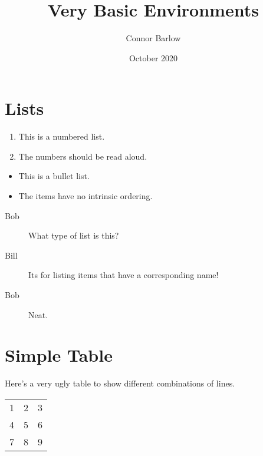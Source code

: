 \documentclass{article}
\title{Very Basic Environments}
\author{Connor Barlow}
\date{October 2020}
\begin{document}
\maketitle

\section{Lists}
\begin{enumerate}
    \item This is a numbered list.
    \item The numbers should be read aloud.
\end{enumerate}
\begin{itemize}
    \item This is a bullet list.
    \item The items have no intrinsic ordering.
\end{itemize}
\begin{description}
    \item[Bob] What type of list is this?
    \item[Bill] Its for listing items that have a corresponding name!
    \item[Bob] Neat.
\end{description}
\section{Simple Table}
\par
Here's a very ugly table to show different combinations of lines.
\par
\begin{tabular}{|l||cr}
1 & 2 & 3 \\
4 & 5 & 6 \\
\hline
7 & 8 & 9 \\
\hline \hline
\end{tabular}
\end{document}
